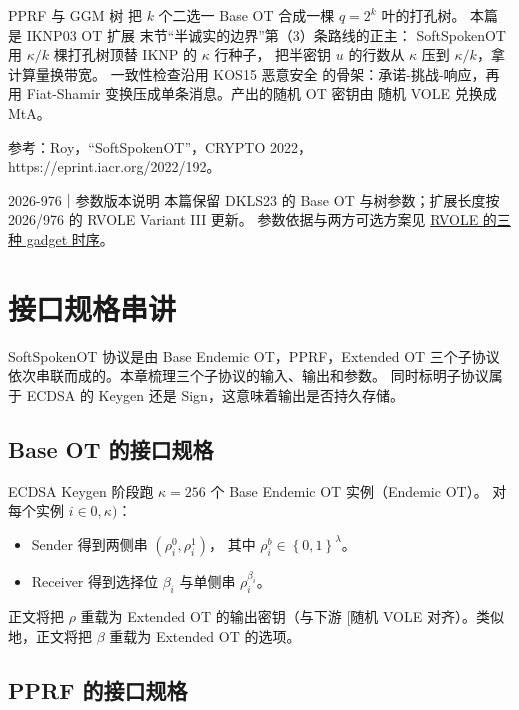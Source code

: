 

PPRF 与 GGM 树 把 $k$ 个二选一 Base OT 合成一棵 $q=2^k$ 叶的打孔树。
本篇是 IKNP03 OT 扩展 末节“半诚实的边界”第（3）条路线的正主：
SoftSpokenOT 用 $\kappa/k$ 棵打孔树顶替 IKNP 的 $\kappa$ 行种子，
把半密钥 $u$ 的行数从 $\kappa$ 压到 $\kappa/k$，拿计算量换带宽。
一致性检查沿用 KOS15 恶意安全 的骨架：承诺-挑战-响应，再用 Fiat-Shamir
变换压成单条消息。产出的随机 OT 密钥由 随机 VOLE 兑换成 MtA。

参考：Roy，“SoftSpokenOT”，CRYPTO 2022，
https://eprint.iacr.org/2022/192。
\begin{patchnote}{2026-976｜参数版本说明}
本篇保留 DKLS23 的 Base OT 与树参数；扩展长度按 2026/976 的 RVOLE Variant III 更新。
参数依据与两方可选方案见 \hyperref[sec:rvole:variants]{RVOLE 的三种 gadget 时序}。
\end{patchnote}

\section{接口规格串讲}

SoftSpokenOT 协议是由 Base Endemic OT，PPRF，Extended OT
三个子协议依次串联而成的。本章梳理三个子协议的输入、输出和参数。
同时标明子协议属于 ECDSA 的 Keygen 还是 Sign，这意味着输出是否持久存储。

\subsection{Base OT 的接口规格}

ECDSA Keygen 阶段跑 $\kappa = 256$ 个 Base Endemic OT 实例（Endemic OT）。
对每个实例 $i\in 0, \kappa)$：

\begin{itemize}

\item
  Sender 得到两侧串 $\left(\rho_i^0, \rho_i^1\right)$，
  其中 $\rho_i^b \in \left\{0,1\right\}^\lambda$。
\item
  Receiver 得到选择位 $\beta_i$ 与单侧串 $\rho_i^{\beta_i}$。
\end{itemize}

正文将把 $\rho$ 重载为 Extended OT 的输出密钥（与下游 {[}随机 VOLE
对齐）。类似地，正文将把 $\beta$ 重载为 Extended OT 的选项。

\subsection{PPRF 的接口规格}

